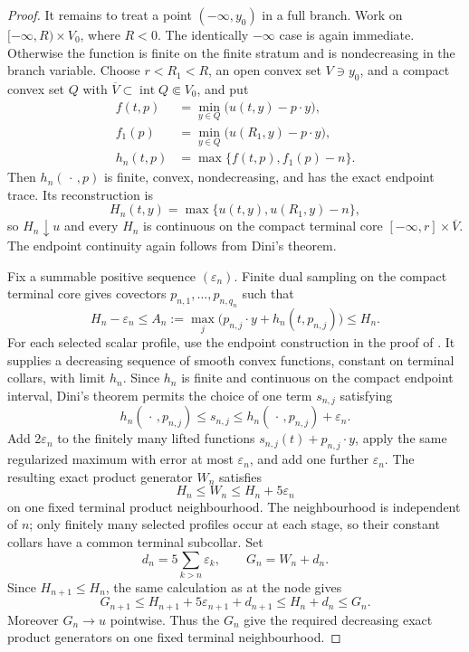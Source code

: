 \begin{proof}
It remains to treat a point $(-\infty,y_0)$ in a full branch.  Work on
$[ -\infty,R)\times V_0$, where $R<0$.  The identically $-\infty$
case is again immediate.  Otherwise the function is finite on the finite
stratum and is nondecreasing in the branch variable.  Choose $r<R_1<R$,
an open convex set $V\ni y_0$, and a compact convex set $Q$ with
$\overline V\subset\operatorname{int}Q\Subset V_0$, and put
\begin{align*}
 f(t,p)&=\min_{y\in Q}\bigl(u(t,y)-p\mathbin\cdot y\bigr),\\
 f_1(p)&=\min_{y\in Q}\bigl(u(R_1,y)-p\mathbin\cdot y\bigr),\\
 h_n(t,p)&=\max\{f(t,p),f_1(p)-n\}.
\end{align*}
Then $h_n(\,\cdot\,,p)$ is finite, convex, nondecreasing, and has the
exact endpoint trace.  Its reconstruction is
\begin{equation}
 H_n(t,y)=\max\{u(t,y),u(R_1,y)-n\},
 \label{eq:p071-infinite-euclidean-endpoint-truncation}
\end{equation}
so $H_n\downarrow u$ and every $H_n$ is continuous on the compact
terminal core $[ -\infty,r]\times\overline V$.  The endpoint continuity
again follows from Dini's theorem.

Fix a summable positive sequence $(\varepsilon_n)$.  Finite dual sampling
on the compact terminal core gives covectors
$p_{n,1},\ldots,p_{n,q_n}$ such that
\[
 H_n-\varepsilon_n\leq
 A_n:=\max_j\bigl(p_{n,j}\mathbin\cdot y
                 +h_n(t,p_{n,j})\bigr)\leq H_n.
\]
For each selected scalar profile, use the endpoint construction in the
proof of .  It supplies a
decreasing sequence of smooth convex functions, constant on terminal
collars, with limit $h_n$.  Since $h_n$ is finite and continuous on the
compact endpoint interval, Dini's theorem permits the choice of one term
$s_{n,j}$ satisfying
\[
       h_n(\,\cdot\,,p_{n,j})\leq s_{n,j}\leq
       h_n(\,\cdot\,,p_{n,j})+\varepsilon_n.
\]
Add $2\varepsilon_n$ to the finitely many lifted functions
$s_{n,j}(t)+p_{n,j}\mathbin\cdot y$, apply the same regularized maximum
with error at most $\varepsilon_n$, and add one further
$\varepsilon_n$.  The resulting exact product generator $W_n$ satisfies
\[
                       H_n\leq W_n\leq H_n+5\varepsilon_n
\]
on one fixed terminal product neighbourhood.  The neighbourhood is
independent of $n$; only finitely many selected profiles occur at each
stage, so their constant collars have a common terminal subcollar.  Set
\[
 d_n=5\sum_{k>n}\varepsilon_k,\qquad G_n=W_n+d_n.
\]
Since $H_{n+1}\leq H_n$, the same calculation as at the node gives
\[
 G_{n+1}\leq H_{n+1}+5\varepsilon_{n+1}+d_{n+1}
 \leq H_n+d_n\leq G_n.
\]
Moreover $G_n\to u$ pointwise.  Thus the $G_n$ give the required
decreasing exact product generators on one fixed terminal neighbourhood.


\end{proof}
